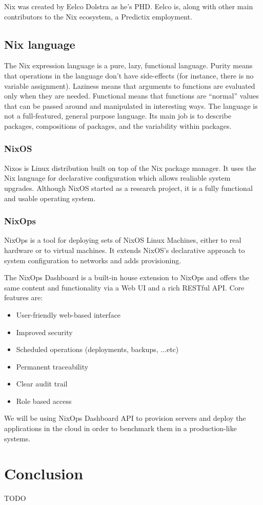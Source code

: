 Nix was created by Eelco Dolstra as he's PHD. Eelco is, along with other main
contributors to the Nix ecosystem, a Predictix employment.
\subsection{Nix language}
The Nix expression language is a pure, lazy, functional language. Purity means
that operations in the language don't have side-effects (for instance, there is
no variable assignment). Laziness means that arguments to functions are
evaluated only when they are needed. Functional means that functions are
“normal” values that can be passed around and manipulated in interesting ways.
The language is not a full-featured, general purpose language. Its main job is
to describe packages, compositions of packages, and the variability within
packages.

\subsubsection{NixOS}
Nixos is Linux distribution built on top of the Nix package manager. It
uses the Nix language for declarative configuration which allows realiable
system upgrades.
Although NixOS started as a research project, it is a fully functional and
usable operating system.

\subsubsection{NixOps}
NixOps is a tool for deploying sets of NixOS Linux Machines, either to real
hardware or to virtual machines. It extends NixOS's declarative approach to
system configuration to networks and adds provisioning.

\par
The NixOps Dashboard is a built-in house extension to NixOps and offers the same
content and functionality via a Web UI and a rich RESTful API. Core features
are:

\begin{itemize}
\item User-friendly web-based interface
\item Improved security
\item Scheduled operations (deployments, backups, ...etc)
\item Permanent traceability
\item Clear audit trail
\item Role based access
\end{itemize}

We will be using NixOps Dashboard API to provision servers and deploy the
applications in the cloud in order to benchmark them in a production-like
systems.

\section*{Conclusion}
TODO
